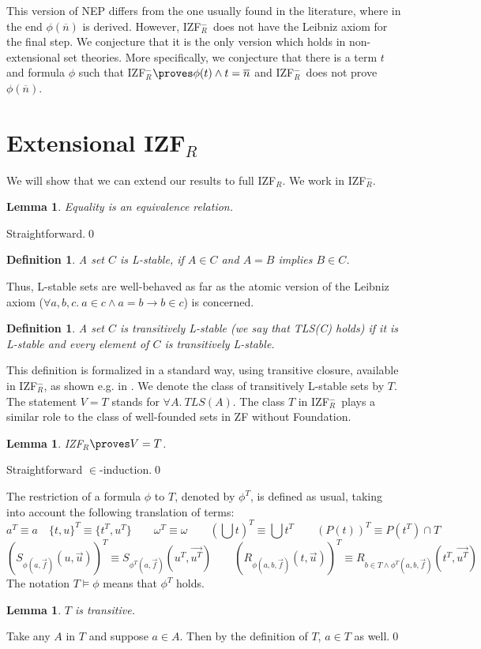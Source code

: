 \documentclass{LMCS}
\newtheorem{definition}[thm]{Definition}
\newtheorem{lemma}[thm]{Lemma}
\newcommand{\ov}[1]{\ensuremath{\overline{#1}}}
\newcommand{\p}{\proves}
\newcommand{\izfr}{IZF${}_R$}
\newcommand{\iizfr}{IZF${}_R^{-}$}
\begin{document}
This version of NEP differs from the one usually found in the literature,
where in the end $\phi(\ov{n})$ is derived. However, \iizfr\ does not have the
Leibniz axiom for the final step. We conjecture that it is the only version
which holds in non-extensional set theories. More specifically, we
conjecture that there is a term $t$ and formula $\phi$ such that \iizfr $\p
\phi(t) \land t = \ov{n}$ and \iizfr\ does not prove $\phi(\ov{n})$. 

\section{Extensional \izfr}\label{lei}

We will show that we can extend our results to full \izfr. We work in \iizfr.

\begin{lemma}
Equality is an equivalence relation.
\end{lemma}
\proof Straightforward.\qed


\begin{definition}
A set $C$ is \emph{L-stable}, if $A \in C$ and $A = B$ implies $B \in
C$. 
\end{definition}

Thus, L-stable sets are well-behaved as far as the atomic version of the
Leibniz axiom ($\forall a, b, c.\ a \in c \land a = b \to b \in c$) is concerned. 

\begin{definition}
A set $C$ is \emph{transitively L-stable} (we say that TLS(C) holds) if it is L-stable and every
element of $C$ is transitively L-stable. 
\end{definition}

This definition is formalized in a standard way, using transitive closure, available
in \iizfr, as shown e.g. in \cite{ar}. We denote the class of transitively L-stable sets
by $T$. The statement $V=T$ stands for $\forall A.\ TLS(A)$. The class $T$ in
\iizfr\ plays a similar role to the class of well-founded sets in ZF without
Foundation. 

\begin{lemma}
\izfr $\p V=T$. 
\end{lemma}
\proof Straightforward $\in$-induction.\qed


The restriction of a formula $\phi$ to $T$, denoted by $\phi^T$, is defined
as usual, taking into account the following translation of terms:
\[
a^T \equiv a \quad \{ t, u \}^T \equiv \{ t^T, u^T \} \qquad \omega^T \equiv \omega \qquad
(\bigcup t)^T \equiv \bigcup t^T \qquad (P(t))^T \equiv P(t^T) \cap T 
\]
\[
(S_{\phi(a, \vec{f})}(u, \vec{u}))^T \equiv S_{\phi^T(a, \vec{f})}(u^T,
\overrightarrow{u^T}) \qquad 
(R_{\phi(a, b, \vec{f})}(t, \vec{u}))^T \equiv R_{b \in T \land \phi^T(a, b,
\vec{f})}(t^T, \overrightarrow{u^T})
\]
The notation $T \models \phi$ means that $\phi^T$ holds. 
\begin{lemma}
$T$ is transitive. 
\end{lemma}
\proof Take any $A$ in $T$ and suppose $a \in A$. Then by the definition of $T$, $a
\in T$ as well.\qed
\end{document}
